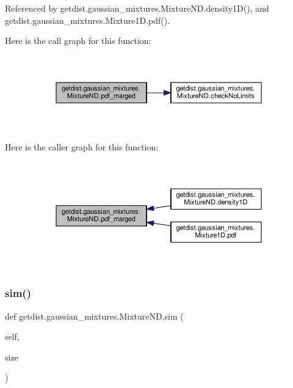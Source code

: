 Referenced by getdist.\+gaussian\+\_\+mixtures.\+Mixture\+N\+D.\+density1\+D(), and getdist.\+gaussian\+\_\+mixtures.\+Mixture1\+D.\+pdf().

Here is the call graph for this function\+:
\nopagebreak
\begin{figure}[H]
\begin{center}
\leavevmode
\includegraphics[width=350pt]{classgetdist_1_1gaussian__mixtures_1_1MixtureND_aa2ffcc1eb16586e772ea92dd662ba9e7_cgraph}
\end{center}
\end{figure}
Here is the caller graph for this function\+:
\nopagebreak
\begin{figure}[H]
\begin{center}
\leavevmode
\includegraphics[width=350pt]{classgetdist_1_1gaussian__mixtures_1_1MixtureND_aa2ffcc1eb16586e772ea92dd662ba9e7_icgraph}
\end{center}
\end{figure}
\mbox{\label{classgetdist_1_1gaussian__mixtures_1_1MixtureND_a59cc8f909638f1b571279518b9285089}} 
\subsubsection{\texorpdfstring{sim()}{sim()}}
{\footnotesize\ttfamily def getdist.\+gaussian\+\_\+mixtures.\+Mixture\+N\+D.\+sim (\begin{DoxyParamCaption}\item[{}]{self,  }\item[{}]{size }\end{DoxyParamCaption})}



